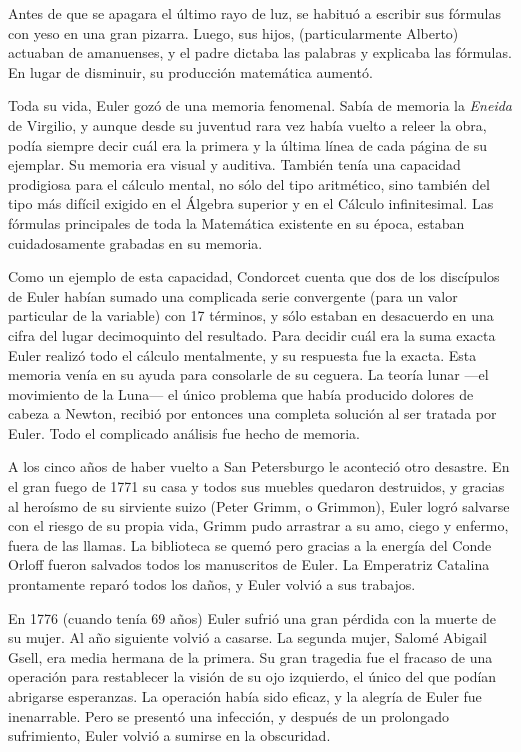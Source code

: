 \documentclass[a4paper, 12pt]{article}
\begin{document}
Antes de que se apagara el último rayo de luz, se habituó a escribir sus fórmulas con yeso en una gran pizarra. Luego, sus hijos, (particularmente Alberto) actuaban de amanuenses, y el padre dictaba las palabras y explicaba las fórmulas. En lugar de disminuir, su producción matemática aumentó.

Toda su vida, Euler gozó de una memoria fenomenal. Sabía de memoria la {\it Eneida} de Virgilio, y aunque desde su juventud rara vez había vuelto a releer la obra, podía siempre decir cuál era la primera y la última línea de cada página de su ejemplar. Su memoria era visual y auditiva. También tenía una capacidad prodigiosa para el cálculo mental, no sólo del tipo aritmético, sino también del tipo más difícil exigido en el Álgebra superior y en el Cálculo infinitesimal. Las fórmulas principales de toda la Matemática existente en su época, estaban cuidadosamente grabadas en su memoria.

Como un ejemplo de esta capacidad, Condorcet cuenta que dos de los discípulos de Euler habían sumado una complicada serie convergente (para un valor particular de la variable) con 17 términos, y sólo estaban en desacuerdo en una cifra del lugar decimoquinto del resultado. Para decidir cuál era la suma exacta Euler realizó todo el cálculo mentalmente, y su respuesta fue la exacta. Esta memoria venía en su ayuda para consolarle de su ceguera. La teoría lunar ---el movimiento de la Luna--- el único problema que había producido dolores de cabeza a Newton, recibió por entonces una completa solución al ser tratada por Euler. Todo el complicado análisis fue hecho de memoria.

A los cinco años de haber vuelto a San Petersburgo le aconteció otro desastre. En el gran fuego de 1771 su casa y todos sus muebles quedaron destruidos, y gracias al heroísmo de su sirviente suizo (Peter Grimm, o Grimmon), Euler logró salvarse con el riesgo de su propia vida, Grimm pudo arrastrar a su amo, ciego y enfermo, fuera de las llamas. La biblioteca se quemó pero gracias a la energía del Conde Orloff fueron salvados todos los manuscritos de Euler. La Emperatriz Catalina prontamente reparó todos los daños, y Euler volvió a sus trabajos.

En 1776 (cuando tenía 69 años) Euler sufrió una gran pérdida con la muerte de su mujer. Al año siguiente volvió a casarse. La segunda mujer, Salomé Abigail Gsell, era media hermana de la primera. Su gran tragedia fue el fracaso de una operación para restablecer la visión de su ojo izquierdo, el único del que podían abrigarse esperanzas. La operación había sido eficaz, y la alegría de Euler fue inenarrable. Pero se presentó una infección, y después de un prolongado sufrimiento, Euler volvió a sumirse en la obscuridad.
\end{document}
